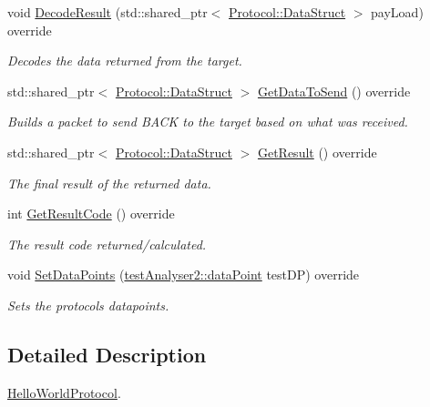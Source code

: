 \begin{DoxyCompactItemize}
void \mbox{\hyperlink{classhwProt_1_1HelloWorldProtocol_a5182e4999269d9f6bf0da6274757c275}{Decode\+Result}} (std\+::shared\+\_\+ptr$<$ \mbox{\hyperlink{structProtocol_1_1DataStruct}{Protocol\+::\+Data\+Struct}} $>$ pay\+Load) override
\begin{DoxyCompactList}\small\item\em Decodes the data returned from the target. \end{DoxyCompactList}\item 
std\+::shared\+\_\+ptr$<$ \mbox{\hyperlink{structProtocol_1_1DataStruct}{Protocol\+::\+Data\+Struct}} $>$ \mbox{\hyperlink{classhwProt_1_1HelloWorldProtocol_a2af49345e67a98301465ffb2743b6177}{Get\+Data\+To\+Send}} () override
\begin{DoxyCompactList}\small\item\em Builds a packet to send B\+A\+CK to the target based on what was received. \end{DoxyCompactList}\item 
std\+::shared\+\_\+ptr$<$ \mbox{\hyperlink{structProtocol_1_1DataStruct}{Protocol\+::\+Data\+Struct}} $>$ \mbox{\hyperlink{classhwProt_1_1HelloWorldProtocol_a501dc84119c67434a430245efd4d7439}{Get\+Result}} () override
\begin{DoxyCompactList}\small\item\em The final result of the returned data. \end{DoxyCompactList}\item 
int \mbox{\hyperlink{classhwProt_1_1HelloWorldProtocol_a90d21e61e3444d0e2265d3b11dcbc74c}{Get\+Result\+Code}} () override
\begin{DoxyCompactList}\small\item\em The result code returned/calculated. \end{DoxyCompactList}\item 
void \mbox{\hyperlink{classhwProt_1_1HelloWorldProtocol_a5946ebe778fcb8dd0136779503a61f82}{Set\+Data\+Points}} (\mbox{\hyperlink{structtestAnalyser2_1_1dataPoint}{test\+Analyser2\+::data\+Point}} test\+DP) override
\begin{DoxyCompactList}\small\item\em Sets the protocols datapoints. \end{DoxyCompactList}\end{DoxyCompactItemize}


\subsection{Detailed Description}
\mbox{\hyperlink{classhwProt_1_1HelloWorldProtocol}{Hello\+World\+Protocol}}. 

